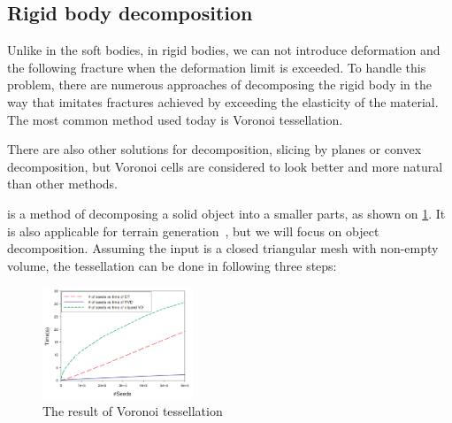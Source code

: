 \subsection{Rigid body decomposition}
Unlike in the soft bodies, in rigid bodies, we can not introduce deformation and the following fracture when the deformation limit is exceeded. To handle this problem, there are numerous approaches of decomposing the rigid body in the way that imitates fractures achieved by exceeding the elasticity of the material. The most common method used today is Voronoi tessellation. 

There are also other solutions for decomposition, \eg slicing by planes or convex decomposition, but Voronoi cells are considered to look better and more natural than other methods.

 is a method of decomposing a solid object into a smaller parts, as shown on \cref{fig:voro}. It is also applicable for \eg terrain generation~\cite{voronoiterrainrealtime}, but we will focus on object decomposition. Assuming the input is a closed triangular mesh with non-empty volume, the tessellation can be done in following three steps:

\begin{figure}
        \centering
        \includegraphics[width=0.4\textwidth]{img/clipped}
        \caption{The result of Voronoi tessellation \cite{yan2010efficient}}
        \label{fig:voro}
\end{figure}

